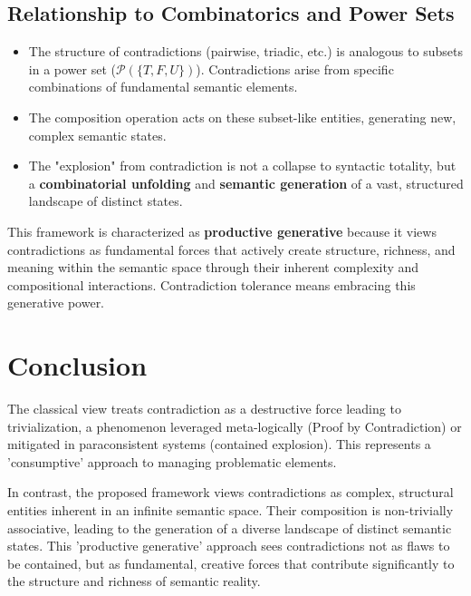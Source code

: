 \documentclass{article}
\begin{document}
	\subsection{Relationship to Combinatorics and Power Sets}
	\begin{itemize}
		\item The structure of contradictions (pairwise, triadic, etc.) is analogous to subsets in a power set ($\mathcal{P}(\{T, F, U\})$). Contradictions arise from specific combinations of fundamental semantic elements.
		\item The composition operation acts on these subset-like entities, generating new, complex semantic states.
		\item The "explosion" from contradiction is not a collapse to syntactic totality, but a \textbf{combinatorial unfolding} and \textbf{semantic generation} of a vast, structured landscape of distinct states.
	\end{itemize}
	
	This framework is characterized as \textbf{productive generative} because it views contradictions as fundamental forces that actively create structure, richness, and meaning within the semantic space through their inherent complexity and compositional interactions. Contradiction tolerance means embracing this generative power.
	
	\section{Conclusion}
	
	The classical view treats contradiction as a destructive force leading to trivialization, a phenomenon leveraged meta-logically (Proof by Contradiction) or mitigated in paraconsistent systems (contained explosion). This represents a 'consumptive' approach to managing problematic elements.
	
	In contrast, the proposed framework views contradictions as complex, structural entities inherent in an infinite semantic space. Their composition is non-trivially associative, leading to the generation of a diverse landscape of distinct semantic states. This 'productive generative' approach sees contradictions not as flaws to be contained, but as fundamental, creative forces that contribute significantly to the structure and richness of semantic reality.
\end{document}
